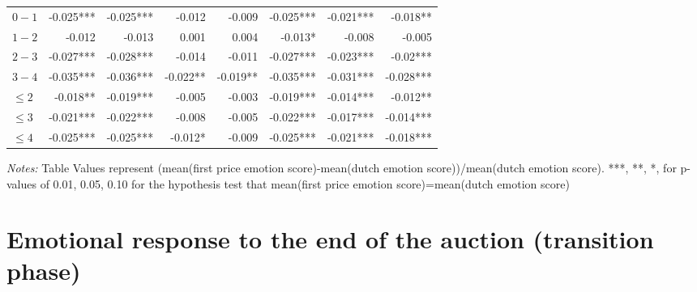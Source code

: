 \documentclass[]{article}
\begin{document}
\begin{table}[!htb]
\begin{tabular}{lrrrrrrr}
\cmidrule(lr){1-1} \cmidrule(lr){2-8}
$0-1$ & -0.025*** & -0.025*** & -0.012    & -0.009    & -0.025*** & -0.021*** & -0.018**  \\ 
  $1-2$ & -0.012    & -0.013    & 0.001     & 0.004     & -0.013*   & -0.008    & -0.005    \\ 
  $2-3$ & -0.027*** & -0.028*** & -0.014    & -0.011    & -0.027*** & -0.023*** & -0.02***  \\ 
  $3-4$ & -0.035*** & -0.036*** & -0.022**  & -0.019**  & -0.035*** & -0.031*** & -0.028*** \\ 
$\leq 2$ & -0.018**  & -0.019*** & -0.005    & -0.003    & -0.019*** & -0.014*** & -0.012**  \\ 
$\leq 3$ & -0.021*** & -0.022*** & -0.008    & -0.005    & -0.022*** & -0.017*** & -0.014*** \\ 
$\leq 4$ & -0.025*** & -0.025*** & -0.012*   & -0.009    & -0.025*** & -0.021*** & -0.018*** \\ 
\bottomrule 

\end{tabular} 

\begin{minipage}{\textwidth}
\footnotesize
\vspace{0.25cm}
\emph{Notes:} Table Values represent  (mean(first price emotion score)-mean(dutch emotion score))/mean(dutch emotion score). ***, **, *, for p-values of 0.01, 0.05, 0.10 for the hypothesis test that mean(first price emotion score)=mean(dutch emotion score)
\end{minipage}
\endgroup
\end{table}

\hypertarget{emotional-response-to-the-end-of-the-auction-transition-phase}{%
\section{Emotional response to the end of the auction (transition
phase)}\label{emotional-response-to-the-end-of-the-auction-transition-phase}}
\end{document}
